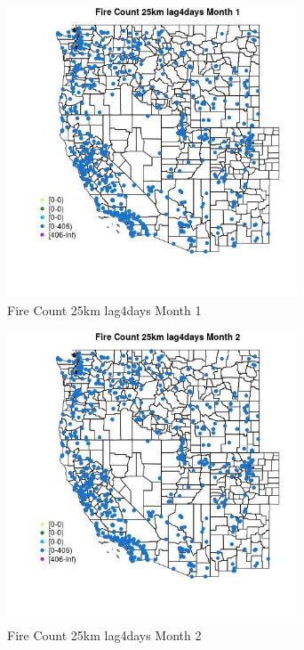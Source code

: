 \begin{figure} 
\centering  
\includegraphics[width=0.77\textwidth]{Code_Outputs/Report_ML_input_PM25_Step4_part_f_de_duplicated_aves_prioritize_24hr_obswNAs_MapObsMo1Fire_Count_25km_lag4days.jpg} 
\caption{\label{fig:Report_ML_input_PM25_Step4_part_f_de_duplicated_aves_prioritize_24hr_obswNAsMapObsMo1Fire_Count_25km_lag4days}Fire Count 25km lag4days Month 1} 
\end{figure} 
 

\begin{figure} 
\centering  
\includegraphics[width=0.77\textwidth]{Code_Outputs/Report_ML_input_PM25_Step4_part_f_de_duplicated_aves_prioritize_24hr_obswNAs_MapObsMo2Fire_Count_25km_lag4days.jpg} 
\caption{\label{fig:Report_ML_input_PM25_Step4_part_f_de_duplicated_aves_prioritize_24hr_obswNAsMapObsMo2Fire_Count_25km_lag4days}Fire Count 25km lag4days Month 2} 
\end{figure} 
 

